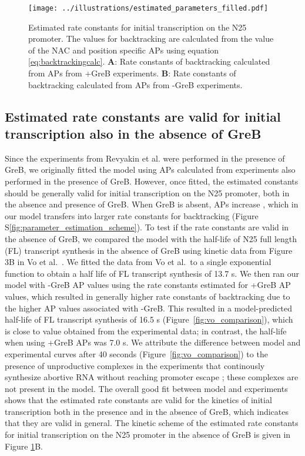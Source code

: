 \begin{figure}
	\begin{center}
      \texttt{[image: ../illustrations/estimated\_parameters\_filled.pdf]}
	\end{center}
    \caption{Estimated rate constants for initial transcription on the N25
        promoter. The values for backtracking are calculated from the value of
        the NAC and position specific APs using equation
        \eqref{eq:backtrackingcalc}. \textbf{A}: Rate constants of
        backtracking calculated from APs from +GreB experiments. \textbf{B}:
        Rate constants of backtracking calculated from APs from -GreB
        experiments.}
    \label{fig:estimated_parameters}
\end{figure}

\subsection{Estimated rate constants are valid for initial transcription also
in the absence of GreB}
Since the experiments from Revyakin et al. were performed in the presence of
GreB, we originally fitted the model using APs calculated from experiments
also performed in the presence of GreB. However, once fitted, the estimated
constants should be generally valid for initial transcription on the N25
promoter, both in the absence and presence of GreB. When GreB is absent, APs
increase \cite{hsu_initial_2006}, which in our model transfers into larger
rate constants for backtracking (Figure
S\ref{fig:parameter_estimation_scheme}). To test if the rate constants are
valid in the absence of GreB, we compared the model with the half-life of N25
full length (FL) transcript synthesis in the absence of GreB using kinetic data
from Figure 3B in Vo et al.\ \cite{vo_vitro_2003-1}. We fitted the data from
Vo et al.\ to a single exponential function to obtain a half life of FL
transcript synthesis of 13.7 s. We then ran our model with -GreB AP
values using the rate constants estimated for +GreB AP values, which resulted
in generally higher rate constants of backtracking due to the higher AP values
associated with -GreB. This resulted in a model-predicted half-life of FL
transcript synthesis of 16.5 s (Figure~\ref{fig:vo_comparison}), which
is close to value obtained from the experimental data; in contrast, the
half-life when using +GreB APs was 7.0 s. We attribute the
difference between model and experimental curves after 40 seconds
(Figure~\ref{fig:vo_comparison}) to the presence of unproductive complexes in
the experiments that continously synthesize abortive RNA without reaching
promoter escape \cite{vo_vitro_2003-1}; these complexes are not present in the
model. The overall good fit between model and experiments shows that the
estimated rate constants are valid for the kinetics of initial transcription
both in the presence and in the absence of GreB, which indicates that they are
valid in general. The kinetic scheme of the estimated rate constants for
initial transcription on the N25 promoter in the absence of GreB is given in
Figure \ref{fig:estimated_parameters}B.

